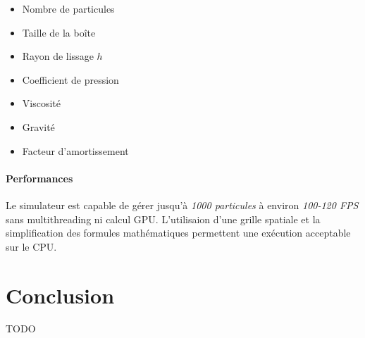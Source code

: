 \documentclass{article}
\begin{document}
\begin{itemize}
    \item Nombre de particules
    \item Taille de la boîte 
    \item Rayon de lissage \(h\)
    \item Coefficient de pression
    \item Viscosité
    \item Gravité
    \item Facteur d'amortissement
\end{itemize}

\paragraph{Performances}

Le simulateur est capable de gérer jusqu'à {\emph {1000 particules}} à environ {\emph {100-120 FPS}} sans multithreading ni calcul GPU. L'utilisaion d'une grille spatiale et la simplification des formules mathématiques permettent une exécution acceptable sur le CPU.

\section{Conclusion}

TODO
\end{document}
